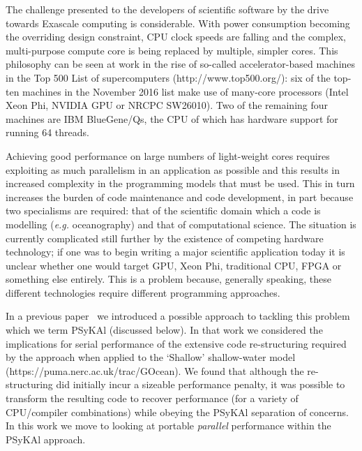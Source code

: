 \documentclass[gmdd, manuscript]{copernicus}
\begin{document}

\introduction

The challenge presented to the developers of scientific software by
the drive towards Exascale computing is considerable. With power
consumption becoming the overriding design constraint, CPU clock
speeds are falling and the complex, multi-purpose compute core is
being replaced by multiple, simpler cores. This philosophy can be seen
at work in the rise of so-called accelerator-based machines in the Top
500 List of supercomputers (http://www.top500.org/): six of the
top-ten machines in the November 2016 list make use of many-core
processors (Intel Xeon Phi, NVIDIA GPU or NRCPC SW26010). Two of the
remaining four machines are IBM BlueGene/Qs, the CPU of which has
hardware support for running 64 threads.

Achieving good performance on large numbers of light-weight cores
requires exploiting as much parallelism in an application as possible
and this results in increased complexity in the programming models
that must be used. This in turn increases the burden of code
maintenance and code development, in part because two specialisms are
required: that of the scientific domain which a code is modelling
(\textit{e.g.} oceanography) and that of computational science. The
situation is currently complicated still further by the existence of
competing hardware technology; if one was to begin writing a major
scientific application today it is unclear whether one would target
GPU, Xeon Phi, traditional CPU, FPGA or something else entirely. This
is a problem because, generally speaking, these different technologies
require different programming approaches.

In a previous paper~\citep{shallow_psykal} we introduced a possible
approach to tackling this problem which we term {PS}y{KA}l (discussed
below). In that work we considered the implications for serial
performance of the extensive code re-structuring required by the
approach when applied to the `Shallow' shallow-water model
(https://puma.nerc.ac.uk/trac/GOcean). We found that although the
re-structuring did initially incur a sizeable performance penalty, it
was possible to transform the resulting code to recover performance
(for a variety of CPU/compiler combinations) while obeying the
{PS}y{KA}l separation of concerns. In this work we move to looking at
portable \textit{parallel} performance within the {PS}y{KA}l approach.
\end{document}
